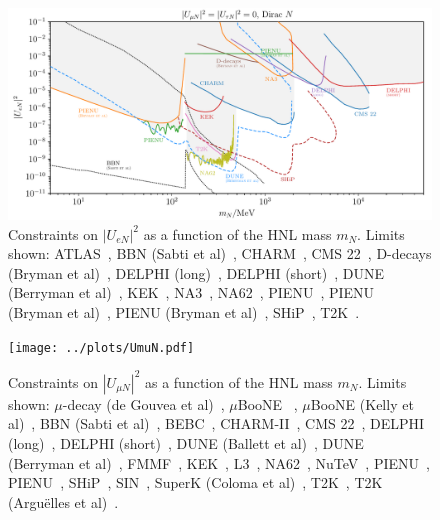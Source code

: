 \documentclass{revtex4-2}%
\begin{document}
%
\normalsize%


\begin{figure}[h!]%
\centering%
\includegraphics[width=1\textwidth]{../plots/UeN.pdf}%
\caption{Constraints on $|U_{e N}|^2$ as a function of the HNL mass $m_N$. Limits shown: ATLAS~\cite{ATLAS:2019kpx}, BBN (Sabti et al)~\cite{Sabti:2020yrt}, CHARM~\cite{CHARM:1985nku}, CMS 22~\cite{2201.05578}, D-decays (Bryman et al)~\cite{Bryman:2019bjg}, DELPHI (long)~\cite{DELPHI:1996qcc}, DELPHI (short)~\cite{DELPHI:1996qcc}, DUNE (Berryman et al)~\cite{Berryman:2019dme}, KEK~\cite{Asano:1981he,}, NA3~\cite{NA3:1986ahv}, NA62~\cite{NA62:2020mcv}, PIENU~\cite{Britton:1992xv}, PIENU (Bryman et al)~\cite{Bryman:2019bjg}, PIENU (Bryman et al)~\cite{Bryman:2019bjg}, SHiP~\cite{SHiP:2018xqw}, T2K~\cite{T2K:2019jwa}.}%
\end{figure}

%


\begin{figure}[h!]%
\centering%
\texttt{[image: ../plots/UmuN.pdf]}%
\caption{Constraints on $|U_{\mu N}|^2$ as a function of the HNL mass $m_N$. Limits shown: $\mu$-decay (de Gouvea et al)~\cite{deGouvea:2015euy}, $\mu$BooNE ~\cite{MicroBooNE:2019izn}, $\mu$BooNE (Kelly et al)~\cite{Kelly:2021xbv}, BBN (Sabti et al)~\cite{Sabti:2020yrt}, BEBC~\cite{WA66:1985mfx}, CHARM-II~\cite{CHARMII:1994jjr}, CMS 22~\cite{2201.05578}, DELPHI (long)~\cite{DELPHI:1996qcc}, DELPHI (short)~\cite{DELPHI:1996qcc}, DUNE (Ballett et al)~\cite{Ballett:2019bgd}, DUNE (Berryman et al)~\cite{Berryman:2019dme}, FMMF~\cite{FMMF:1994yvb,}, KEK~\cite{Asano:1981he,}, L3~\cite{L3:2001zfe}, NA62~\cite{NA62:2021bji}, NuTeV~\cite{NuTeV:1999kej}, PIENU~\cite{PIENU:2019usb}, PIENU~\cite{PIENU:2019usb}, SHiP~\cite{SHiP:2018xqw}, SIN~\cite{Daum:1987bg}, SuperK (Coloma et al)~\cite{Coloma:2019htx}, T2K~\cite{T2K:2019jwa}, T2K (Argu\"elles et al)~\cite{Arguelles:2021dqn}.}%
\end{figure}
\end{document}
